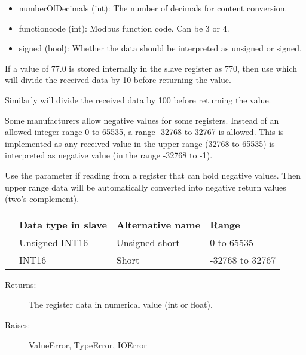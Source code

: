 \documentclass[letterpaper,10pt,english]{sphinxmanual}
\begin{document}
\begin{fulllineitems}
\begin{fulllineitems}
\begin{description}
\begin{itemize}
\item {} 
numberOfDecimals (int): The number of decimals for content conversion.

\item {} 
functioncode (int): Modbus function code. Can be 3 or 4.

\item {} 
signed (bool): Whether the data should be interpreted as unsigned or signed.

\end{itemize}

\end{description}

If a value of 77.0 is stored internally in the slave register as 770, then use 
which will divide the received data by 10 before returning the value.

Similarly  will divide the received data by 100 before returning the value.

Some manufacturers allow negative values for some registers. Instead of
an allowed integer range 0 to 65535, a range -32768 to 32767 is allowed. This is
implemented as any received value in the upper range (32768 to 65535) is
interpreted as negative value (in the range -32768 to -1).

Use the parameter  if reading from a register that can hold
negative values. Then upper range data will be automatically converted into
negative return values (two's complement).

\noindent\begin{tabulary}{\linewidth}{|L|L|L|L|}
\hline
\textsf{\relax 
{}
\unskip}\relax &\textsf{\relax 
Data type in slave
\unskip}\relax &\textsf{\relax 
Alternative name
\unskip}\relax &\textsf{\relax 
Range
\unskip}\relax \\
\hline
{}
&
Unsigned INT16
&
Unsigned short
&
0 to 65535
\\
\hline
{}
&
INT16
&
Short
&
-32768 to 32767
\\
\hline\end{tabulary}

\begin{description}
\item[{Returns:}] \leavevmode
The register data in numerical value (int or float).

\item[{Raises:}] \leavevmode
ValueError, TypeError, IOError


\end{description}
\end{fulllineitems}
\end{fulllineitems}
\end{document}
